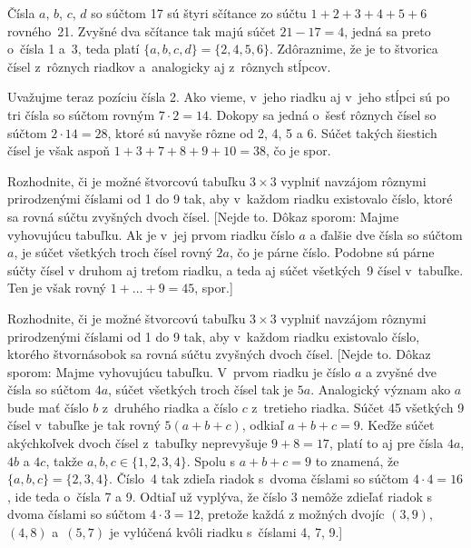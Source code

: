 {Čísla $a$, $b$, $c$, $d$ so súčtom 17 sú štyri sčítance
zo súčtu $1+2+3+4+5+6$ rovného~21. Zvyšné dva sčítance tak majú
súčet $21-17=4$, jedná sa preto o~čísla 1 a~3, teda platí
$\{a,b,c,d\}=\{2,4,5,6\}$. Zdôraznime, že je to štvorica čísel
z~rôznych riadkov a~analogicky aj z~rôznych stĺpcov.

Uvažujme teraz pozíciu čísla 2. Ako vieme,
v~jeho riadku aj v~jeho stĺpci sú po tri čísla so súčtom
rovným $7\cdot2=14$. Dokopy sa jedná o~šesť rôznych čísel so
súčtom $2\cdot14=28$, ktoré sú navyše rôzne od 2, 4, 5 a 6.
Súčet takých šiestich čísel je však aspoň
$1+3+7+8+9+10=38$, čo je spor.


Rozhodnite, či je možné štvorcovú tabuľku $3 \times 3$ vyplniť
navzájom rôznymi prirodzenými číslami od 1 do 9 tak,
aby v~každom riadku existovalo číslo, ktoré sa rovná súčtu
zvyšných dvoch čísel.
[Nejde to. Dôkaz sporom: Majme vyhovujúcu tabuľku.
Ak je v~jej prvom riadku číslo $a$ a ďalšie dve čísla so súčtom $a$,
je súčet všetkých troch čísel rovný $2a$, čo je párne číslo.
Podobne sú párne súčty čísel v druhom aj treťom riadku, a teda aj
súčet všetkých~9 čísel v~tabuľke. Ten je však rovný $1+\ldots+9=45$, spor.]

Rozhodnite, či je možné štvorcovú tabuľku $3 \times 3$ vyplniť
navzájom rôznymi prirodzenými číslami od 1 do 9 tak,
aby v~každom riadku existovalo číslo, ktorého štvornásobok
sa rovná súčtu zvyšných dvoch čísel.
[Nejde to. Dôkaz sporom: Majme vyhovujúcu tabuľku. V~prvom riadku
je číslo $a$ a zvyšné dve čísla so súčtom $4a$, súčet všetkých troch čísel
tak je $5a$. Analogický význam ako $a$ bude mať číslo
$b$ z~druhého riadka a číslo $c$ z~tretieho riadka.
Súčet 45 všetkých 9 čísel v~tabuľke
je tak rovný $5(a+b+c)$, odkiaľ $a+b+c=9$. Keďže súčet akýchkoľvek
dvoch čísel z~tabuľky neprevyšuje $9+8=17$, platí to aj pre čísla
$4a$, $4b$ a $4c$, takže $a,b,c\in\{1,2,3,4\}$. Spolu s $a+b+c=9$
to znamená, že $\{a,b,c\}=\{2,3,4\}$. Číslo~4 tak zdieľa riadok
s~dvoma číslami so súčtom $4\cdot4=16$, ide teda o~čísla 7 a 9. Odtiaľ
už vyplýva, že číslo 3 nemôže zdieľať riadok s dvoma číslami so súčtom
$4\cdot3=12$, pretože každá z možných dvojíc $(3,9)$, $(4,8)$ a~$(5,7)$ je vylúčená kvôli riadku s~číslami 4, 7, 9.]

}
